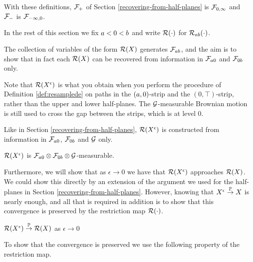 {With these definitions, $\mathcal{F}_{+}$ of Section \ref{recovering-from-half-planes} is
$\mathcal{F}_{0,\infty}$ and $\mathcal{F}_{-}$ is
$\mathcal{F}_{-\infty,0}$.

In the rest of this
section we fix $a < 0 < b$ and write $\mathcal{R}(\cdot)$ for
$\mathcal{R}_{{a}{b}}(\cdot)$.

\newcommand{\Resresamplede}{\Res{\resamplede}}
\newcommand{\Ressampled}{\Res{\sampled}}

The collection of variables of the form $\Ressampled$ generates
$\mathcal{F}_{a b}$, and the aim is to show that in fact each $\Ressampled$ can
be recovered from information in $\mathcal{F}_{a 0}$ and $\mathcal{F}_{0 b}$
only.

Note that $\Resresamplede$ is what you obtain when you perform the
procedure of Definition \ref{def:resamplede} on paths in the
$(a,0)$-strip and the $(0,\top)$-strip, rather than the upper and lower
half-planes.  The $\mathcal{G}$-measurable Brownian motion is still used to
cross the gap between the strips, which is at level $0$.

Like in Section \ref{recovering-from-half-planes}, $\Resresamplede$
is constructed from information in $\mathcal{F}_{a 0}$,
$\mathcal{F}_{0 b}$ and $\mathcal{G}$ only.

\begin{observation}
  $\mathcal{R}(X^{\epsilon})$ is $\mathcal{F}_{a 0} \otimes \mathcal{F}_{0 b}
  \otimes \mathcal{G}$-measurable.
\end{observation}

Furthermore, we will show that as $\epsilon \to 0$ we have that
$\Resresamplede$ approaches $\Ressampled$.  We could show this
directly by an extension of the argument we used for the half-planes
in Section \ref{recovering-from-half-planes}.  However, knowing that
$X^{\epsilon} \overset{\mathbb{P}}\to X$ is nearly enough, and all that is required
in addition is to show that this convergence is preserved by the
restriction map $\mathcal{R}(\cdot)$.

\begin{lemma}
    \label{lem:resamplede-to-sampled-strip}
    $\mathcal{R}(X^{\epsilon}) \overset{\mathbb{P}}\to \mathcal{R}(X)$ as $\epsilon \to 0$
\end{lemma}

To show that the convergence is preserved we use the following
property of the restriction map.

\newcommand{\stripleavetimenotturningpoint}[1]{$\stripleavetime{#1}$ is
  not a turning point of the path $#1$}

}
